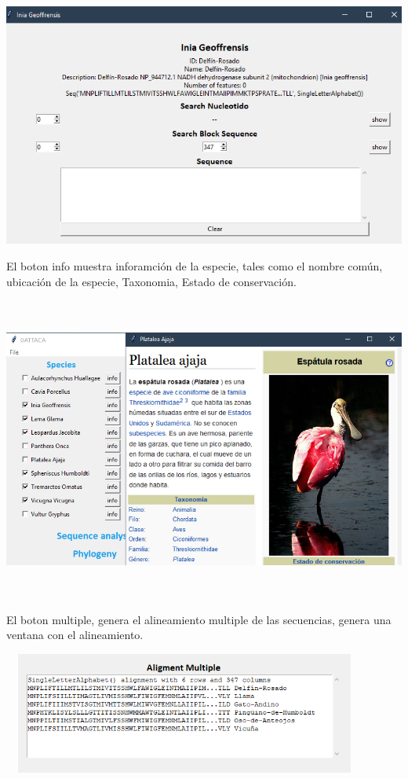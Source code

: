 \documentclass[a4paper]{article}
\begin{document}
\begin{center}
	\includegraphics[width=15cm,height=8cm]{boton-seq.png}
\end{center}

El boton info muestra inforamción de la especie, tales como el nombre común, ubicación de la especie, Taxonomia, Estado de conservación.

\begin{center}
	\includegraphics[width=17cm,height=10cm]{info.png}
\end{center}

El boton multiple, genera el alineamiento multiple de las secuencias, genera una ventana con el alineamiento.

\begin{center}
	\includegraphics[width=12cm,height=4cm]{multiple.png}
\end{center}
\end{document}
